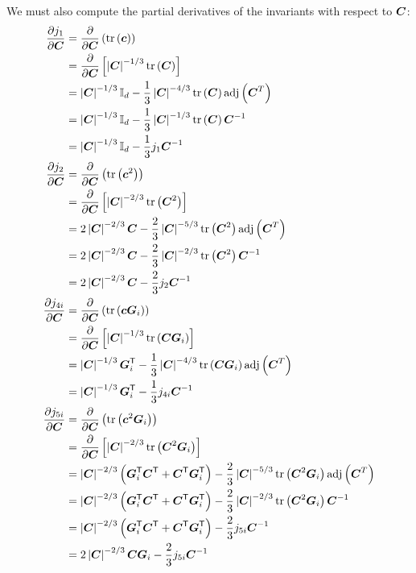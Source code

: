 \documentclass{article}
\begin{document}
\normalsize
We must also compute the partial derivatives of the invariants with respect to $\bC$:
\begin{align*}
    \frac{\partial j_1}{\partial \bC} &= \frac{\partial}{\partial \bC} \left(\Tr\left(\bc\right)\right) \\
    &= \frac{\partial}{\partial \bC} \left[\left|\bC\right|^{-1/3} \Tr\left(\bC\right)\right] \\
    &= \left|\bC\right|^{-1/3} \polI_d -\frac{1}{3} \left|\bC\right|^{-4/3} \Tr\left(\bC\right) \operatorname{adj}\left(\bC^T\right) \\ 
    &= \left|\bC\right|^{-1/3} \polI_d -\frac{1}{3} \left|\bC\right|^{-1/3} \Tr\left(\bC\right) \bC^{-1} \\ 
    &= \left|\bC\right|^{-1/3} \polI_d -\frac{1}{3} j_1 \bC^{-1} \\
    \frac{\partial j_2}{\partial \bC} &= \frac{\partial}{\partial \bC} \left(\Tr\left(\bc^2\right)\right)\\
    &= \frac{\partial}{\partial \bC} \left[\left|\bC\right|^{-2/3} \Tr\left(\bC^2\right)\right] \\
    &= 2\left|\bC\right|^{-2/3} \bC -\frac{2}{3} \left|\bC\right|^{-5/3} \Tr\left(\bC^2\right) \operatorname{adj}\left(\bC^T\right)  \\
    &= 2\left|\bC\right|^{-2/3} \bC -\frac{2}{3} \left|\bC\right|^{-2/3} \Tr\left(\bC^2\right) \bC^{-1} \\
    &= 2\left|\bC\right|^{-2/3} \bC -\frac{2}{3} j_2 \bC^{-1} \\
    \frac{\partial j_{4i}}{\partial \bC} &= \frac{\partial}{\partial \bC} \left(\Tr\left(\bc\bG_i\right)\right)\\
    &= \frac{\partial}{\partial \bC} \left[ \left|\bC\right|^{-1/3} \Tr\left(\bC\bG_i\right)\right] \\
    &= \left|\bC\right|^{-1/3} \bG_i\tr - \frac{1}{3} \left|\bC\right|^{-4/3} \Tr\left(\bC\bG_i\right) \operatorname{adj}\left(\bC^T\right) \\
    &= \left|\bC\right|^{-1/3} \bG_i\tr - \frac{1}{3} j_{4i} \bC^{-1} \\
    \frac{\partial j_{5i}}{\partial \bC} &= \frac{\partial}{\partial \bC} \left(\Tr\left(\bc^2\bG_i\right)\right)\\
    &= \frac{\partial}{\partial \bC} \left[ \left|\bC\right|^{-2/3} \Tr\left(\bC^2\bG_i\right)\right] \\
    &= \left|\bC\right|^{-2/3} \left(\bG_i\tr\bC\tr + \bC\tr \bG_i\tr\right) -\frac{2}{3} \left|\bC\right|^{-5/3} \Tr\left(\bC^2\bG_i\right) \operatorname{adj}\left(\bC^T\right) \\
    &= \left|\bC\right|^{-2/3} \left(\bG_i\tr\bC\tr + \bC\tr \bG_i\tr\right) -\frac{2}{3} \left|\bC\right|^{-2/3} \Tr\left(\bC^2\bG_i\right) \bC^{-1} \\
    &= \left|\bC\right|^{-2/3} \left(\bG_i\tr\bC\tr + \bC\tr \bG_i\tr\right) -\frac{2}{3} j_{5i} \bC^{-1} \\
    &= 2\left|\bC\right|^{-2/3} \bC\bG_i -\frac{2}{3} j_{5i} \bC^{-1}
\end{align*}
\end{document}
